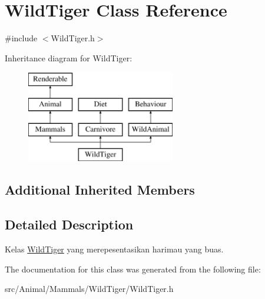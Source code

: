 \hypertarget{classWildTiger}{\section{Wild\+Tiger Class Reference}
\label{classWildTiger}
}


{\ttfamily \#include $<$Wild\+Tiger.\+h$>$}

Inheritance diagram for Wild\+Tiger\+:\begin{figure}[H]
\begin{center}
\leavevmode
\includegraphics[height=4.000000cm]{classWildTiger}
\end{center}
\end{figure}
\subsection*{Additional Inherited Members}


\subsection{Detailed Description}
Kelas \hyperlink{classWildTiger}{Wild\+Tiger} yang merepesentasikan harimau yang buas. 

The documentation for this class was generated from the following file\+:\begin{DoxyCompactItemize}
\item 
src/\+Animal/\+Mammals/\+Wild\+Tiger/Wild\+Tiger.\+h\end{DoxyCompactItemize}
